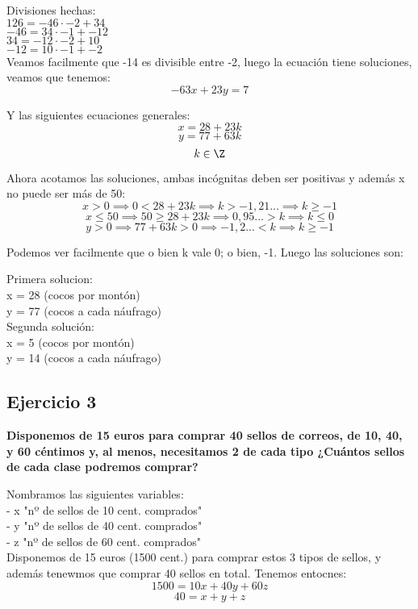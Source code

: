 \documentclass[11pt, a4paper, titlepage]{article}
\begin{document}
Divisiones hechas: \\
$ 126 = -46 \cdot -2 + 34 $ \\
$ -46 = 34 \cdot -1 + -12 $ \\
$ 34 = -12 \cdot -2 + 10 $ \\
$ -12 = 10 \cdot -1 + -2 $ \\

Veamos facilmente que -14 es divisible entre -2, luego la ecuación tiene soluciones, veamos que tenemos:
$$ -63x + 23y = 7 $$

Y las siguientes ecuaciones generales:
$$ x = 28 + 23k $$
$$ y = 77 + 63k $$
$$ k \in \Z $$

Ahora acotamos las soluciones, ambas incógnitas deben ser positivas y además x no puede ser más de 50:
$$ x > 0 \implies 0 < 28 + 23k \implies k > -1,21... \implies k \geq -1 $$
$$ x \leq 50 \implies 50 \geq 28 + 23k \implies 0,95... > k \implies k \leq 0 $$
$$ y > 0 \implies 77 + 63k > 0 \implies -1,2... < k \implies k \geq -1 $$

Podemos ver facilmente que o bien k vale 0; o bien, -1. Luego las soluciones son:

Primera solucion: \\
x = 28 (cocos por montón) \\
y = 77 (cocos a cada náufrago) \\

Segunda solución: \\
x = 5 (cocos por montón) \\
y = 14 (cocos a cada náufrago) \\

\subsection{\LARGE{Ejercicio 3}}

\textbf{Disponemos de 15 euros para comprar 40 sellos de correos, de 10, 40, y
60 céntimos y, al menos, necesitamos 2 de cada tipo ¿Cuántos sellos de cada clase
podremos comprar?}

Nombramos las siguientes variables: \\
- x \equiv "nº de sellos de 10 cent. comprados" \\
- y \equiv "nº de sellos de 40 cent. comprados" \\
- z \equiv "nº de sellos de 60 cent. comprados" \\

Disponemos de 15 euros (1500 cent.) para comprar estos 3 tipos de sellos, y además tenewmos que comprar 40 sellos en total. Tenemos entocnes:
$$ 1500 = 10x + 40y + 60z $$
$$ 40 = x + y + z $$
\end{document}
